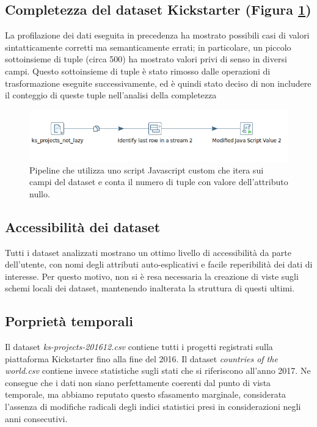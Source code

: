 \subsection{Completezza del dataset Kickstarter (Figura \ref{fig:dqcompletezza})}
La profilazione dei dati eseguita in precedenza ha mostrato possibili casi di valori sintatticamente corretti ma semanticamente errati; in particolare, un piccolo sottoinsieme di tuple (circa 500) ha mostrato valori privi di senso in diversi campi. Questo sottoinsieme di tuple è stato rimosso dalle operazioni di trasformazione eseguite successivamente, ed è quindi stato deciso di non includere il conteggio di queste tuple nell'analisi della completezza

\begin{figure}[h!]
	\centering
	\includegraphics[width=0.7\linewidth]{images/DQ_completezza}
	\caption{Pipeline che utilizza uno script Javascript custom che itera sui campi del dataset e conta il numero di tuple con valore dell'attributo nullo.}
	\label{fig:dqcompletezza}
\end{figure}


\subsection{Accessibilità dei dataset}
Tutti i dataset analizzati mostrano un ottimo livello di accessibilità da parte dell'utente, con nomi degli attributi auto-esplicativi e facile reperibilità dei dati di interesse. Per questo motivo, non si è resa necessaria la creazione di viste sugli schemi locali dei dataset, mantenendo inalterata la struttura di questi ultimi.

\subsection{Porprietà temporali}
Il dataset \textit{ks-projects-201612.csv} contiene tutti i progetti registrati sulla piattaforma Kickstarter fino alla fine del 2016. Il dataset \textit{countries of the world.csv} contiene invece statistiche sugli stati che si riferiscono all'anno 2017. Ne consegue che i dati non siano perfettamente coerenti dal punto di vista temporale, ma abbiamo reputato questo sfasamento marginale, considerata l'assenza di modifiche radicali degli indici statistici presi in considerazioni negli anni consecutivi.

